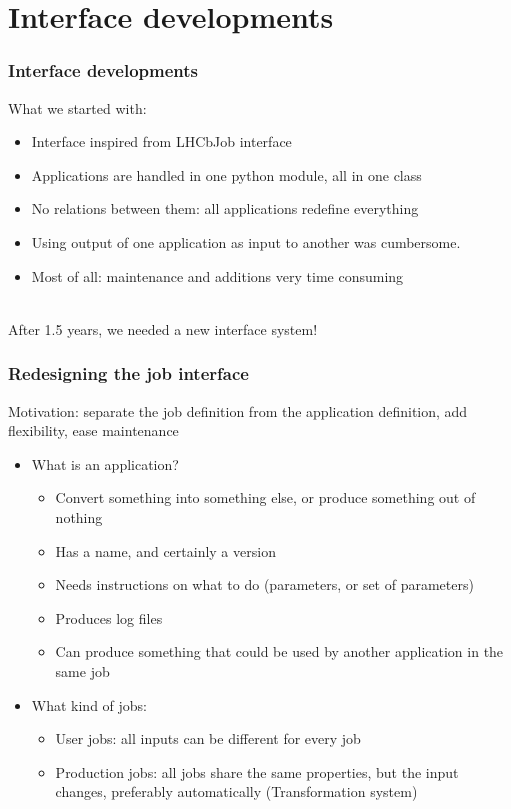 \documentclass{beamer}
\begin{document}
\section{Interface developments}
\label{sec:interface}
\begin{frame}
  \frametitle{Interface developments}
What we started with:
\begin{itemize}
\item Interface inspired from LHCbJob interface
\item Applications are handled in one python module, all in one class
\item No relations between them: all applications redefine everything
\item Using output of one application as input to another was cumbersome.
\item Most of all: maintenance and additions very time consuming
\end{itemize}
~\\
After 1.5 years, we needed a new interface system!
\end{frame}
\begin{frame}
  \frametitle{Redesigning the job interface}
Motivation: separate the job definition from the application
definition, add \alert{flexibility}, ease \alert{maintenance}
\begin{itemize}
\item What is an application? 
\begin{itemize}
\item Convert something into something else, or produce something out
  of nothing
\item Has a name, and certainly a version
\item Needs instructions on what to do (parameters, or set of
  parameters)
\item Produces log files
\item Can produce something that could be used by another application in
  the same job
\end{itemize}
\item What kind of jobs:
\begin{itemize}
\item User jobs: all inputs can be different for every job
\item Production jobs: all jobs share the same properties, but the
  input changes, preferably automatically (Transformation system)
\end{itemize}
\end{itemize}
\end{frame}
\end{document}
